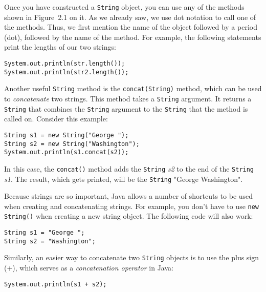 Once you have constructed a {\tt String} object, you can use any of
the methods shown in Figure~2.1 on it. As we already
saw, we use dot notation to call one of the methods. Thus, we first
mention the name of the object followed by a period (dot), followed by
the name of the method. For example, the following statements print
the lengths of our two strings:

\begin{jjjlisting}
\begin{lstlisting}
System.out.println(str.length());
System.out.println(str2.length());
\end{lstlisting}
\end{jjjlisting}

Another useful {\tt String} method is the {\tt concat(String)} method,
which can be used to {\it concatenate} two strings. This method takes
a {\tt String} argument. It returns a {\tt String} that combines the
{\tt String} argument to the {\tt String} that the method is called on.
Consider this example:

\begin{jjjlisting}
\begin{lstlisting}
String s1 = new String("George ");
String s2 = new String("Washington");
System.out.println(s1.concat(s2));
\end{lstlisting}
\end{jjjlisting}

\noindent In this case, the {\tt concat()} method adds 
the {\tt String} {\it s2} to the end of the {\tt String} {\it s1}. The
result, which gets printed, will be the {\tt String} "George
Washington".

Because strings are so important, Java allows a number of
shortcuts to be used when creating and concatenating strings.
For example, you don't have to use {\tt new String()} when
creating a new string object. The following code will also work:

\begin{jjjlisting}
\begin{lstlisting}
String s1 = "George ";
String s2 = "Washington";
\end{lstlisting}
\end{jjjlisting}

\noindent Similarly, an easier way to concatenate two {\tt String}
objects is to use the plus sign (+), which serves as a {\em concatenation
operator} in Java:

\begin{jjjlisting}
\begin{lstlisting}
System.out.println(s1 + s2);
\end{lstlisting}
\end{jjjlisting}

